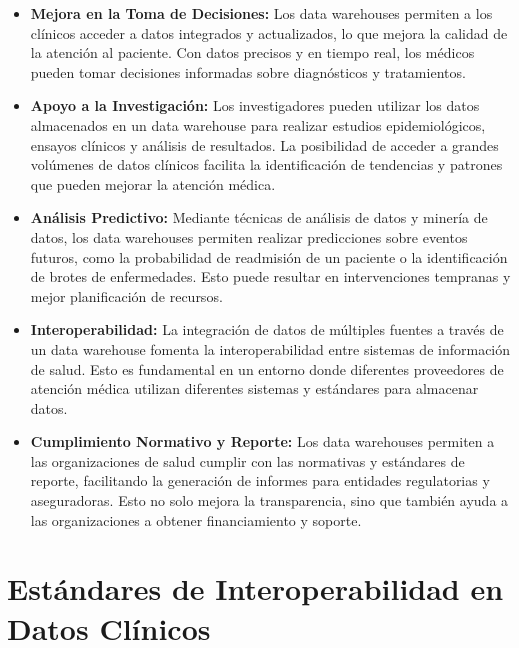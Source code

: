 \documentclass[12pt, a4paper, twoside]{article}
\begin{document}
	\begin{itemize}
		\item \textbf{Mejora en la Toma de Decisiones:} Los data warehouses permiten a los clínicos acceder a datos integrados y actualizados, lo que mejora la calidad de la atención al paciente. Con datos precisos y en tiempo real, los médicos pueden tomar decisiones informadas sobre diagnósticos y tratamientos.
		
		\item \textbf{Apoyo a la Investigación:} Los investigadores pueden utilizar los datos almacenados en un data warehouse para realizar estudios epidemiológicos, ensayos clínicos y análisis de resultados. La posibilidad de acceder a grandes volúmenes de datos clínicos facilita la identificación de tendencias y patrones que pueden mejorar la atención médica.
		
		\item \textbf{Análisis Predictivo:} Mediante técnicas de análisis de datos y minería de datos, los data warehouses permiten realizar predicciones sobre eventos futuros, como la probabilidad de readmisión de un paciente o la identificación de brotes de enfermedades. Esto puede resultar en intervenciones tempranas y mejor planificación de recursos.
		
		\item \textbf{Interoperabilidad:} La integración de datos de múltiples fuentes a través de un data warehouse fomenta la interoperabilidad entre sistemas de información de salud. Esto es fundamental en un entorno donde diferentes proveedores de atención médica utilizan diferentes sistemas y estándares para almacenar datos.
		
		\item \textbf{Cumplimiento Normativo y Reporte:} Los data warehouses permiten a las organizaciones de salud cumplir con las normativas y estándares de reporte, facilitando la generación de informes para entidades regulatorias y aseguradoras. Esto no solo mejora la transparencia, sino que también ayuda a las organizaciones a obtener financiamiento y soporte.
		
	\end{itemize}


	
	\section{Estándares de Interoperabilidad en Datos Clínicos}\cite{meditecsInteroperabilidad}
	
\end{document}

